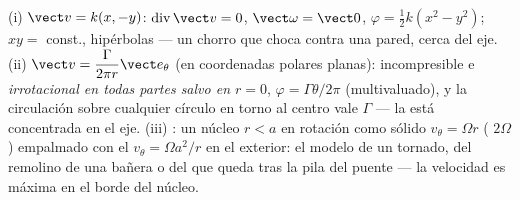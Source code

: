 \begin{example}\label{ex:b2:fluid-kinematics:planeflows}
(i) \emph{} $\vect v = k(x, -y)$: $\operatorname{div}\vect v =
0$, $\vect\omega = \vect 0$, $\varphi = \tfrac12k(x^2 - y^2)$; 
$xy = $ const., hipérbolas --- un chorro que choca contra una pared, cerca
del eje. (ii) \emph{} $\vect v = \dfrac{\Gamma}{2\pi r}\vect e_\theta$ (en
coordenadas polares planas): incompresible e \emph{irrotacional en todas
partes salvo en $r = 0$}, $\varphi = \Gamma\theta/2\pi$ (multivaluado), y la
circulación sobre cualquier círculo en torno al centro vale $\Gamma$ --- la
 está concentrada en el eje. (iii) \emph{}: un
núcleo $r < a$ en rotación como sólido $v_\theta = \Omega r$ ( $2\Omega$)
empalmado con el  $v_\theta = \Omega a^2/r$ en el exterior: el
modelo de un tornado, del remolino de una bañera o del que queda tras la
pila del puente --- la velocidad es máxima en el borde del núcleo.
\end{example}

